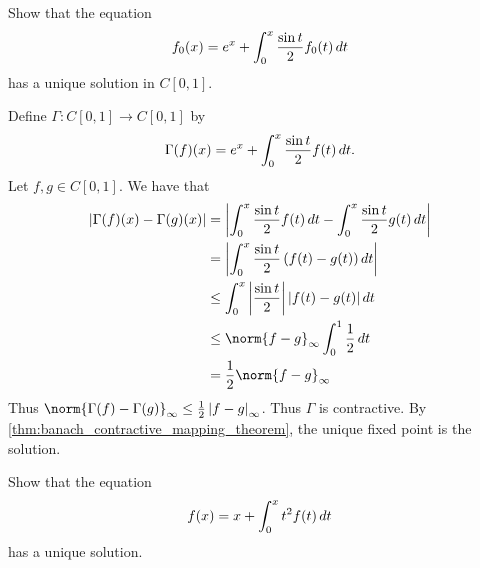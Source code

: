 \documentclass[notoc,notitlepage]{tufte-book}
\begin{document}
\begin{eg}
  Show that the equation
  \begin{equation*}
    f_0(x) = e^{x} + \int_{0}^{x} \frac{\sin t}{2}f_0(t) \mathop{}\!d{t}
  \end{equation*}
  has a unique solution in $C[0, 1]$.
\end{eg}

\begin{solution}
  Define $\Gamma : C[0, 1] \to C[0, 1]$ by
  \begin{equation*}
    \Gamma(f)(x) = e^x + \int_{0}^{x} \frac{\sin t}{2} f(t) \mathop{}\!d{t}.
  \end{equation*}
  Let $f, g \in C[0, 1]$. We have that
  \begin{align*}
    \abs{ \Gamma(f)(x) - \Gamma(g)(x) }
      &= \abs{ \int_{0}^{x} \frac{\sin t}{2} f(t) \dif{t} - \int_{0}^{x} \frac{\sin t}{2} g(t) \dif{t} } \\
      &= \abs{ \int_{0}^{x} \frac{\sin t}{2} \left( f(t) - g(t) \right) \dif{t} } \\
      &\leq \int_{0}^{x} \abs{ \frac{\sin t}{2} } \abs{ f(t) - g(t) } \dif{t} \\
      &\leq \norm{ f - g }_\infty \int_{0}^{1}  \frac{1}{2} \dif{t} \\
      &= \frac{1}{2} \norm{ f - g }_\infty
  \end{align*}
  Thus $\norm{ \Gamma(f) - \Gamma(g) }_\infty \leq \frac{1}{2} \abs{ f - g }_\infty$. Thus $\Gamma$ is contractive. By \cref{thm:banach_contractive_mapping_theorem}, the unique fixed point is the solution.
\end{solution}

\begin{eg}
  Show that the equation
  \begin{equation}\label{eq:banach_contractive_map_eg2}
    f(x) = x + \int_{0}^{x} t^2 f(t) \mathop{}\!d{t}
  \end{equation}
  has a unique solution.
\end{eg}
\end{document}
